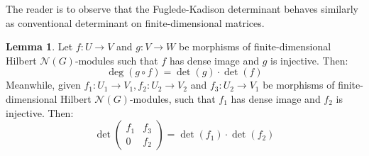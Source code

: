 \documentclass[11pt]{report}
\theoremstyle{definition}
\newtheorem{Lemma}[Def]{Lemma}
\theoremstyle{plain}
\newcommand{\vna}{\mathcal{N}}
\begin{document}
The reader is to observe that the Fuglede-Kadison determinant behaves similarly as conventional determinant on finite-dimensional matrices.
\begin{Lemma}\label{3.14}
	Let $f:U\to V$ and $g:V\to W$ be morphisms of finite-dimensional Hilbert $\vna(G)$-modules such that $f$ has dense image and $g$ is injective. Then:
	\begin{equation*}
	\deg(g\circ f)=\det(g)\cdot \det(f)
	\end{equation*}
	Meanwhile, given $f_1:U_1\to V_1, f_2:U_2\to V_2$ and $f_3:U_2\to V_1$ be morphisms of finite-dimensional Hilbert $\vna(G)$-modules, such that $f_1$ has dense image and $f_2$ is injective. Then:
	\begin{equation*}
	\det\begin{pmatrix}
	f_1 &f_3\\ 0 &f_2
	\end{pmatrix}=\det(f_1)\cdot \det(f_2)
	\end{equation*}
\end{Lemma}
\end{document}
